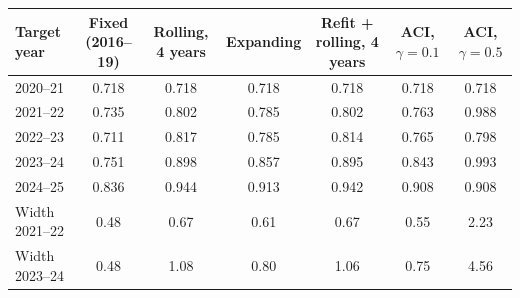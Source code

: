 \begin{tabular}{lcccccc}
\toprule
Target year & Fixed (2016--19) & Rolling, 4 years & Expanding & Refit + rolling, 4 years & ACI, $\gamma=0.1$ & ACI, $\gamma=0.5$ \\
\midrule
2020--21 & 0.718 & 0.718 & 0.718 & 0.718 & 0.718 & 0.718 \\
2021--22 & 0.735 & 0.802 & 0.785 & 0.802 & 0.763 & 0.988 \\
2022--23 & 0.711 & 0.817 & 0.785 & 0.814 & 0.765 & 0.798 \\
2023--24 & 0.751 & 0.898 & 0.857 & 0.895 & 0.843 & 0.993 \\
2024--25 & 0.836 & 0.944 & 0.913 & 0.942 & 0.908 & 0.908 \\
\midrule
Width 2021--22 & 0.48 & 0.67 & 0.61 & 0.67 & 0.55 & 2.23 \\
Width 2023--24 & 0.48 & 1.08 & 0.80 & 1.06 & 0.75 & 4.56 \\
\bottomrule
\end{tabular}
